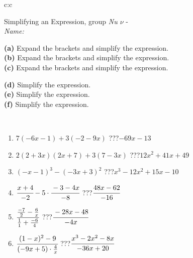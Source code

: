 \documentclass[10pt]{report}
\begin{document}
\newpage
\thispagestyle{empty}
\begin{tabular}{c:c}
\begin{minipage}[c][104.5mm][t]{0.5\linewidth}
\begin{center}
\vspace{7mm}
{\huge Simplifying an Expression, group \textit{Nu $\nu$} -}\\[5mm]
\textit{Name:}\phantom{xxxxxxxxxxxxxxxxxxxxxxxxxxxxxxxxxxxxxxxxxxxxxxxxxxxxxxxxxxxxxxxxx}\\[5mm]
\begin{minipage}{0.95\linewidth}
\begin{center}
{\small \begin{minipage}{0.6\textwidth}
\textbf{(a)} Expand the brackets and simplify the expression. \\[1mm]
\textbf{(b)} Expand the brackets and simplify the expression. \\[1mm]
\textbf{(c)} Expand the brackets and simplify the expression.
\end{minipage} \begin{minipage}{0.39\textwidth}
\textbf{(d)} Simplify the expression. \\[1mm]
\textbf{(e)} Simplify the expression. \\[1mm]
\textbf{(f)} Simplify the expression.
\end{minipage}
}
\end{center}
\end{minipage}
\\[4mm]
\begin{minipage}{0.79\linewidth}
\begin{center}
\begin{varwidth}{\linewidth}
\begin{enumerate}
\normalsize
\item $7(-6x-1)+3(-2-9x)$\quad \dotfill\; ???\;\dotfill \quad $-69x-13$
\item $2(2+3x)(2x+7)+3(7-3x)$\quad \dotfill\; ???\;\dotfill \quad $12x^2+41x+49$
\item $(-x-1)^3-(-3x+3)^2$\quad \dotfill\; ???\;\dotfill \quad $x^3-12x^2+15x-10$
\item $\cfrac{x+4}{-2}-5\cdot\cfrac{-3-4x}{-8}$\quad \dotfill\; ???\;\dotfill \quad $\cfrac{48x-62}{-16}$
\item $\cfrac{\frac{-7}{2}-\frac{6}{x}}{\frac{1}{1}+\frac{-6}{4}}$\quad \dotfill\; ???\;\dotfill \quad $\cfrac{-28x-48}{-4x}$
\item $\cfrac{(1-x)^2-9}{(-9x+5)\cdot\frac{4}{x}}$\quad \dotfill\; ???\;\dotfill \quad $\cfrac{x^3-2x^2-8x}{-36x+20}$

\end{enumerate}
\end{varwidth}
\end{center}
\end{minipage}
\end{center}
\end{minipage}
\end{tabular}
\end{document}
